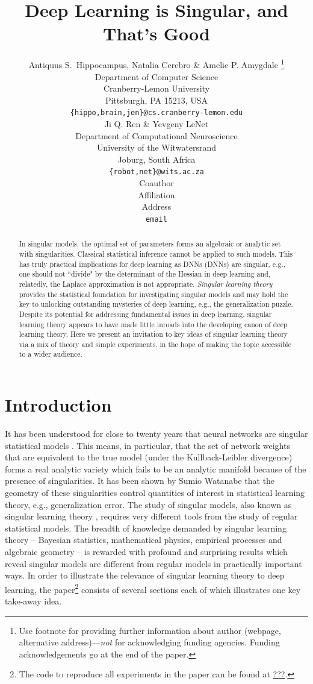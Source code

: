 \documentclass{article} %
\title{Deep Learning is Singular, and That's Good}
\author{Antiquus S.~Hippocampus, Natalia Cerebro \& Amelie P. Amygdale \thanks{ Use footnote for providing further information
about author (webpage, alternative address)---\emph{not} for acknowledging
funding agencies.  Funding acknowledgements go at the end of the paper.} \\
Department of Computer Science\\
Cranberry-Lemon University\\
Pittsburgh, PA 15213, USA \\
\texttt{\{hippo,brain,jen\}@cs.cranberry-lemon.edu} \\
\And
Ji Q. Ren \& Yevgeny LeNet \\
Department of Computational Neuroscience \\
University of the Witwatersrand \\
Joburg, South Africa \\
\texttt{\{robot,net\}@wits.ac.za} \\
\AND
Coauthor \\
Affiliation \\
Address \\
\texttt{email}
}
\begin{document}
\maketitle

\begin{abstract}
In singular models, the optimal set of parameters forms an algebraic or analytic set with singularities. Classical statistical inference cannot be applied to such models.  This has truly practical implications for deep learning as DNNs (DNNs) are singular, e.g., one should not ``divide" by the determinant of the Hessian in deep learning and, relatedly, the Laplace approximation is not appropriate. \textit{Singular learning theory} provides the statistical foundation for investigating singular models and may hold the key to unlocking outstanding mysteries of deep learning, e.g., the generalization puzzle.
Despite its potential for addressing fundamental issues in deep learning, singular learning theory appears to have made little inroads into the developing canon of deep learning theory. Here we present an invitation to key ideas of singular learning theory via a mix of theory and simple experiments, in the hope of making the topic accessible to a wider audience. 
\end{abstract}

\section{Introduction}

It has been understood for close to twenty years that neural networks are singular statistical models \cite{amari_learning_2003, watanabe_almost_2007}. This means, in particular, that the set of network weights that are equivalent to the true model (under the Kullback-Leibler divergence) forms a real analytic variety which fails to be an analytic manifold because of the presence of singularities. It has been shown by Sumio Watanabe that the geometry of these singularities control quantities of interest in statistical learning theory, e.g., generalization error. The study of singular models, also known as singular learning theory \citep{watanabe_algebraic_2009}, requires very different tools from the study of regular statistical models. The breadth of knowledge demanded by singular learning theory -- Bayesian statistics, mathematical physics, empirical processes and algebraic geometry -- is rewarded with profound and surprising results which reveal singular models are different from regular models in practically important ways.
In order to illustrate the relevance of singular learning theory to deep learning, the paper\footnote{The code to reproduce all experiments in the paper can be found at \url{???}.} consists of several sections each of which illustrates one key take-away idea. 
\end{document}
